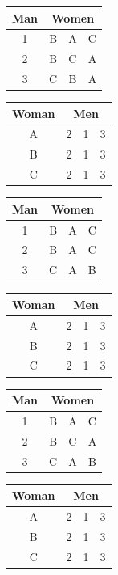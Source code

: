 \documentclass[11pt]{article}
\begin{document}
\begin{qunlist}
\begin{itemize}
{\begin{center}
\begin{tabular}{|c|ccc|}\hline 
Man&\multicolumn{3}{|c|}{Women}\\\hline 
1&B&A&C\\\hline 
2&B&C&A\\\hline 
3&C&B&A\\\hline
\end{tabular} 
\hspace{2cm}
\begin{tabular}{|c|ccc|}\hline 
Woman&\multicolumn{3}{|c|}{Men}\\\hline 
A&2&1&3\\\hline 
B&2&1&3\\\hline 
C&2&1&3\\\hline
\end{tabular}
\end{center}

\begin{center}
\begin{tabular}{|c|ccc|}\hline 
Man&\multicolumn{3}{|c|}{Women}\\\hline 
1&B&A&C\\\hline 
2&B&A&C\\\hline 
3&C&A&B\\\hline
\end{tabular} 
\hspace{2cm}
\begin{tabular}{|c|ccc|}\hline 
Woman&\multicolumn{3}{|c|}{Men}\\\hline 
A&2&1&3\\\hline 
B&2&1&3\\\hline 
C&2&1&3\\\hline
\end{tabular}
\end{center}

\begin{center}
\begin{tabular}{|c|ccc|}\hline 
Man&\multicolumn{3}{|c|}{Women}\\\hline 
1&B&A&C\\\hline 
2&B&C&A\\\hline 
3&C&A&B\\\hline
\end{tabular} 
\hspace{2cm}
\begin{tabular}{|c|ccc|}\hline 
Woman&\multicolumn{3}{|c|}{Men}\\\hline 
A&2&1&3\\\hline 
B&2&1&3\\\hline 
C&2&1&3\\\hline
\end{tabular}
\end{center}
}
\fi


\end{itemize}
\end{qunlist}
\end{document}
